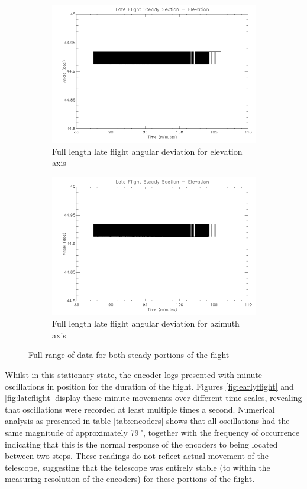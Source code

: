 {\begin{figure}[h!]
\begin{subfigure}{0.45\textwidth}
		\includegraphics[width=1\linewidth]{appendix/img/campaign_results/latealt.png}
		\caption{Full length late flight angular deviation for elevation axis}
		\label{fig:sub:latealt}
	\end{subfigure}
	\begin{subfigure}{0.45\textwidth}
		\includegraphics[width=1\linewidth]{appendix/img/campaign_results/latealt.png}
		\caption{Full length late flight angular deviation for azimuth axis}
		\label{fig:sub:lateaz}
	\end{subfigure}
	\caption{Full range of data for both steady portions of the flight}
	\label{fig:fullsteady}
\end{figure}

Whilst in this stationary state, the encoder logs presented with minute oscillations in position for the duration of the flight. Figures \ref{fig:earlyflight} and \ref{fig:lateflight} display these minute movements over different time scales, revealing that oscillations were recorded at least multiple times a second. Numerical analysis as presented in table \ref{tab:encoders} shows that all oscillations had the same magnitude of approximately 79\,", together with the frequency of occurrence indicating that this is the normal response of the encoders to being located between two steps. These readings do not reflect actual movement of the telescope, suggesting that the telescope was entirely stable (to within the measuring resolution of the encoders) for these portions of the flight. 

}

